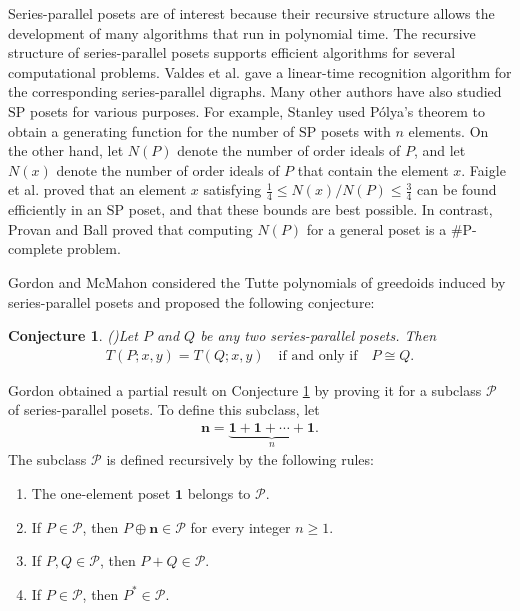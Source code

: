 \documentclass[11pt,a4paper]{article}
\newtheorem{conjecture}[theorem]{Conjecture}
\begin{document}
Series-parallel posets are of interest because their recursive structure
allows the development of many algorithms that run in polynomial time.
The recursive structure of series-parallel posets supports
efficient algorithms for several computational problems.
Valdes et al. \cite{Valdes1981} gave a linear-time recognition
algorithm for the corresponding series-parallel digraphs.
Many other authors have also studied $\mathrm{SP}$ posets
for various purposes.
For example, Stanley \cite{Stanley1974} used P\'olya's theorem
to obtain a generating function for the number of $\mathrm{SP}$ posets
with $n$ elements.
On the other hand, let $N(P)$ denote the number of order ideals of $P$,
and let $N(x)$ denote the number of order ideals of $P$ that contain
the element $x$.
Faigle et al. \cite{Faigle1986} proved that an element $x$
satisfying $\frac14\leq N(x)/N(P)\leq\frac34$ can be found
efficiently in an $\mathrm{SP}$ poset, and that these bounds
are best possible. In contrast, Provan and Ball \cite{Provan1983} proved that
computing $N(P)$ for a general poset is a $\#\mathrm P$-complete problem.

Gordon and McMahon \cite{GordonMcMahon2022} considered the Tutte
polynomials of greedoids induced by series-parallel posets
and proposed the following conjecture:

\begin{conjecture}(\cite{GordonMcMahon2022})\label{conj:reconstruction}
Let $P$ and $Q$ be any two series-parallel posets. Then
\begin{eqnarray*}\label{eq:conj}
T(P;x,y)=T(Q;x,y)\quad\text{if and only if}\quad P\cong Q.
\end{eqnarray*}
\end{conjecture}

Gordon \cite{Gordon1996} obtained a partial result on
Conjecture \ref{conj:reconstruction} by proving it for a subclass
$\mathcal{P}$ of series-parallel posets.
To define this subclass, let
\begin{eqnarray*}
\mathbf{n}=\underbrace{\mathbf{1}+\mathbf{1}+\cdots+\mathbf{1}}_{n}.
\end{eqnarray*}
The subclass $\mathcal{P}$ is defined recursively by the following rules:
\begin{enumerate}
    \item[\textup{(i)}] The one-element poset $\mathbf{1}$
    belongs to $\mathcal{P}$.
    \item[\textup{(ii)}] If $P\in\mathcal{P}$, then
    $P\oplus\mathbf{n}\in\mathcal{P}$ for every integer $n\geq 1$.
    \item[\textup{(iii)}] If $P,Q\in\mathcal{P}$, then
    $P+Q\in\mathcal{P}$.
    \item[\textup{(iv)}] If $P\in\mathcal{P}$, then
    $P^*\in\mathcal{P}$.
\end{enumerate}
\end{document}
